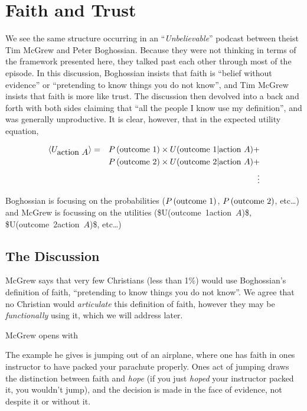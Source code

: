 \documentclass{tufte-book}
\begin{document}
\section{Faith and Trust}\label{faith-and-trust}

We see the same structure occurring in an ``\emph{Unbelievable}''
podcast\citep{Brierley:2014aa} between theist Tim McGrew and Peter
Boghossian. Because they were not thinking in terms of the framework
presented here, they talked past each other through most of the episode.
In this discussion, Boghossian insists that faith is ``belief without
evidence'' or ``pretending to know things you do not know'', and Tim
McGrew insists that faith is more like trust. The discussion then
devolved into a back and forth with both sides claiming that ``all the
people I know use my definition'', and was generally unproductive. It is
clear, however, that in the expected utility equation,

\begin{eqnarray*}
\langle U_{\mbox{action $A$}} \rangle &=& \P{outcome 1}\times U(\mbox{outcome 1}|\mbox{action $A$}) + \\
&&\P{outcome 2}\times U(\mbox{outcome 2}|\mbox{action $A$}) + \\
&&\vdots
\end{eqnarray*}

Boghossian is focusing on the probabilities (\(\P{outcome 1}\),
\(\P{outcome 2}\), etc\ldots{}) and McGrew is focussing on the utilities
(\$U(\mbox{outcome 1}\textbar{}\mbox{action $A$})\$,
\$U(\mbox{outcome 2}\textbar{}\mbox{action $A$})\$, etc\ldots{})

\subsection{The Discussion}

McGrew says that very few Christians (less than 1\%) would use
Boghossian's definition of faith, ``pretending to know things you do not
know''. We agree that no Christian would \emph{articulate} this
definition of faith, however they may be \emph{functionally} using it,
which we will address later.

McGrew opens with

The example he gives is jumping out of an airplane, where one has faith
in ones instructor to have packed your parachute properly. Ones act of
jumping draws the distinction between faith and \emph{hope} (if you just
\emph{hoped} your instructor packed it, you wouldn't jump), and the
decision is made in the face of evidence, not despite it or without it.
\end{document}
